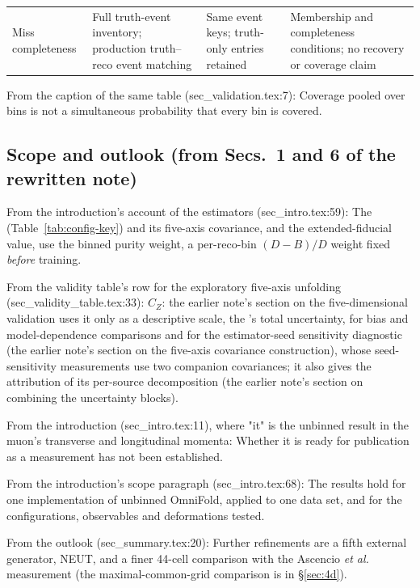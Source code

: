 \begin{tabular}{@{}p{}p{}p{}p{}@{}}
Miss completeness & Full truth-event inventory; production truth--reco event matching & Same event keys; truth-only entries retained & Membership and completeness conditions; no recovery or coverage claim \\
\end{tabular}

From the caption of the same table (sec\_validation.tex:7):
Coverage pooled over bins is not a simultaneous probability that every bin is covered.

\subsection{Scope and outlook (from Secs.~1 and 6 of the rewritten note)}
From the introduction's account of the estimators (sec\_intro.tex:59):
The \resFiveAxis{} (Table~\ref{tab:config-key}) and its five-axis covariance, and the extended-fiducial value, use the binned purity weight, a per-reco-bin $(D-B)/D$ weight fixed \emph{before} training.

From the validity table's row for the exploratory five-axis unfolding (sec\_validity\_table.tex:33):
$C_Z$: the earlier note's section on the five-dimensional validation uses it only as a descriptive scale, the \estPurity{}'s total uncertainty, for bias and model-dependence comparisons and for the estimator-seed sensitivity diagnostic (the earlier note's section on the five-axis covariance construction), whose seed-sensitivity measurements use two companion covariances; it also gives the attribution of its per-source decomposition (the earlier note's section on combining the uncertainty blocks).

From the introduction (sec\_intro.tex:11), where "it" is the unbinned result in the muon's transverse and longitudinal momenta:
Whether it is ready for publication as a measurement has not been established.

From the introduction's scope paragraph (sec\_intro.tex:68):
The results hold for one implementation of unbinned OmniFold, applied to one data set, and for the configurations, observables and deformations tested.

From the outlook (sec\_summary.tex:20):
Further refinements are a fifth external generator, NEUT, and a finer 44-cell comparison with the Ascencio \emph{et al.} measurement (the maximal-common-grid comparison is in \S\ref{sec:4d}).
